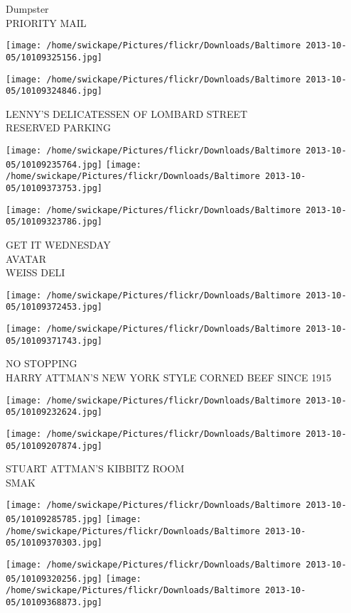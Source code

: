 \documentclass[10pt,letterpaper]{article}
\begin{document}
Dumpster\\
PRIORITY MAIL
\pagebreak

\texttt{[image: /home/swickape/Pictures/flickr/Downloads/Baltimore 2013-10-05/10109325156.jpg]}

\vspace{0.25in}
\texttt{[image: /home/swickape/Pictures/flickr/Downloads/Baltimore 2013-10-05/10109324846.jpg]}

LENNY'S DELICATESSEN OF LOMBARD STREET\\
RESERVED PARKING
\pagebreak

\texttt{[image: /home/swickape/Pictures/flickr/Downloads/Baltimore 2013-10-05/10109235764.jpg]}
\texttt{[image: /home/swickape/Pictures/flickr/Downloads/Baltimore 2013-10-05/10109373753.jpg]}

\vspace{0.25in}
\texttt{[image: /home/swickape/Pictures/flickr/Downloads/Baltimore 2013-10-05/10109323786.jpg]}

GET IT WEDNESDAY\\
AVATAR\\
WEISS DELI
\pagebreak

\texttt{[image: /home/swickape/Pictures/flickr/Downloads/Baltimore 2013-10-05/10109372453.jpg]}

\vspace{0.25in}
\texttt{[image: /home/swickape/Pictures/flickr/Downloads/Baltimore 2013-10-05/10109371743.jpg]}

NO STOPPING\\
HARRY ATTMAN'S NEW YORK STYLE CORNED BEEF SINCE 1915
\pagebreak

\texttt{[image: /home/swickape/Pictures/flickr/Downloads/Baltimore 2013-10-05/10109232624.jpg]}

\vspace{0.25in}
\texttt{[image: /home/swickape/Pictures/flickr/Downloads/Baltimore 2013-10-05/10109207874.jpg]}

STUART ATTMAN'S KIBBITZ ROOM\\
SMAK
\pagebreak

\texttt{[image: /home/swickape/Pictures/flickr/Downloads/Baltimore 2013-10-05/10109285785.jpg]}
\texttt{[image: /home/swickape/Pictures/flickr/Downloads/Baltimore 2013-10-05/10109370303.jpg]}

\texttt{[image: /home/swickape/Pictures/flickr/Downloads/Baltimore 2013-10-05/10109320256.jpg]}
\texttt{[image: /home/swickape/Pictures/flickr/Downloads/Baltimore 2013-10-05/10109368873.jpg]}
\end{document}
